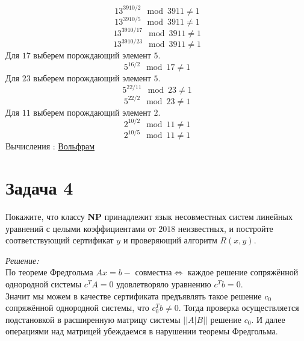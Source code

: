 \documentclass[12pt]{article}
\begin{document}
\begin{center}
\end{center}
\[13^{3910/2} \mod 3911 \not= 1\]
\[13^{3910/5} \mod 3911 \not= 1\]
\[13^{3910/17} \mod 3911 \not= 1\]
\[13^{3910/23} \mod 3911 \not= 1\]
Для $17$ выберем порождающий элемент $5$.
\[5^{16/2} \mod 17 \not= 1\]
Для $23$ выберем порождающий элемент $5$.
\[5^{22/11} \mod 23 \not= 1\]
\[5^{22/2} \mod 23 \not= 1\]
Для $11$ выберем порождающий элемент $2$.
\[2^{10/2} \mod 11 \not= 1\]
\[2^{10/5} \mod 11 \not= 1\]
Вычисления : \href{https://www.wolframalpha.com/input/?i=13%5E(3910%2F2)+mod+3911;+13%5E(3910%2F5)+mod+3911,+13%5E(3910%2F17)+mod+3911,+13%5E(3910%2F23)+mod+3911,++5%5E(16%2F2)+mod+17,++5%5E(22%2F11)+mod+23,+5%5E(22%2F2)+mod+23,+2%5E(10%2F2)+mod+11,+2%5E(10%2F5)+mod+11} {Вольфрам}
\section* {Задача 4}
Покажите, что классу \textbf{NP} принадлежит язык несовместных систем линейных уравнений с целыми коэффициентами от $2018$ неизвестных, и постройте соответствующий сертификат $y$ и проверяющий алгоритм $R(x,y)$.

{\itshape Решение:}
\\

По теореме Фредгольма $Ax=b - \text{ совместна} \Leftrightarrow  $ каждое решение сопряжённой однородной системы  $ c^TA = 0 \text{ удовлетворяло уравнению } c^Tb =0$. \\

Значит мы можем в качестве сертификата предъявлять такое решение $c_0$ сопряжённой однородной системы, что $c^T_0 b \ne 0$. Тогда проверка осуществляется подстановкой в расширенную матрицу системы $||A|B|| $ решение $c_0$. И далее операциями над матрицей убеждаемся в нарушении теоремы Фредгольма. \\
\end{document}
